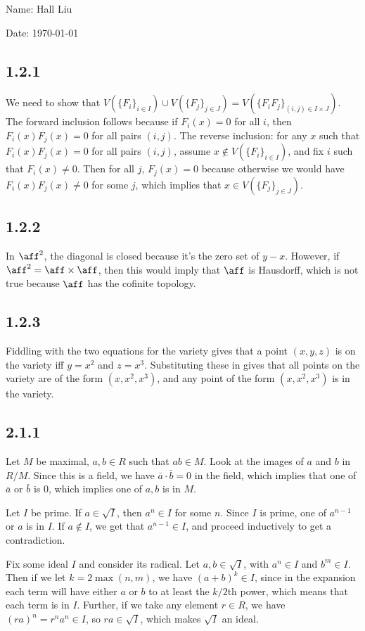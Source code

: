 \documentclass{article}
\begin{document}
Name: Hall Liu

Date: \today 
\vspace{1.5cm}
\subsection*{1.2.1}
We need to show that $V(\{F_i\}_{i\in I})\cup V(\{F_j\}_{j\in J})=V(\{F_iF_j\}_{(i,j)\in I\times J})$. The forward inclusion follows because if $F_i(x)=0$ for all $i$, then $F_i(x)F_j(x)=0$ for all pairs $(i,j)$. The reverse inclusion: for any $x$ such that $F_i(x)F_j(x)=0$ for all pairs $(i,j)$, assume $x\not\in V(\{F_i\}_{i\in I})$, and fix $i$ such that $F_i(x)\neq0$. Then for all $j$, $F_j(x)=0$ because otherwise we would have $F_i(x)F_j(x)\neq0$ for some $j$, which implies that $x\in V(\{F_j\}_{j\in J})$.
\subsection*{1.2.2}
In $\aff^2$, the diagonal is closed because it's the zero set of $y-x$. However, if $\aff^2=\aff\times\aff$, then this would imply that $\aff$ is Hausdorff, which is not true because $\aff$ has the cofinite topology.
\subsection*{1.2.3}
Fiddling with the two equations for the variety gives that a point $(x,y,z)$ is on the variety iff $y=x^2$ and $z=x^3$. Substituting these in gives that all points on the variety are of the form $(x,x^2,x^3)$, and any point of the form $(x,x^2,x^3)$ is in the variety.
\subsection*{2.1.1}
Let $M$ be maximal, $a,b\in R$ such that $ab\in M$. Look at the images of $a$ and $b$ in $R/M$. Since this is a field, we have $\bar{a}\cdot\bar{b}=0$ in the field, which implies that one of $\bar{a}$ or $\bar{b}$ is $0$, which implies one of $a,b$ is in $M$.

Let $I$ be prime. If $a\in\sqrt{I}$, then $a^n\in I$ for some $n$. Since $I$ is prime, one of $a^{n-1}$ or $a$ is in $I$. If $a\not\in I$, we get that $a^{n-1}\in I$, and proceed inductively to get a contradiction.

Fix some ideal $I$ and consider its radical. Let $a,b\in\sqrt{I}$, with $a^n\in I$ and $b^m\in I$. Then if we let $k=2\max(n,m)$, we have $(a+b)^k\in I$, since in the expansion each term will have either $a$ or $b$ to at least the $k/2$th power, which means that each term is in $I$. Further, if we take any element $r\in R$, we have $(ra)^n=r^na^n\in I$, so $ra\in\sqrt{I}$, which makes $\sqrt{I}$ an ideal.
\end{document}
